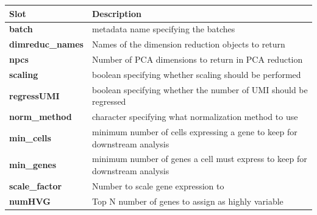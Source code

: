 \documentclass[
]{book}
\begin{document}
\begin{longtable}[]{@{}
  >{\raggedright\arraybackslash}p{}
  >{\raggedright\arraybackslash}p{}@{}}
\toprule
\textbf{Slot} & \textbf{Description} \\
\midrule
\endhead
\textbf{batch} & metadata name specifying the batches \\
\textbf{dimreduc\_names} & Names of the dimension reduction objects to return \\
\textbf{npcs} & Number of PCA dimensions to return in PCA reduction \\
\textbf{scaling} & boolean specifying whether scaling should be performed \\
\textbf{regressUMI} & boolean specifying whether the number of UMI should be regressed \\
\textbf{norm\_method} & character specifying what normalization method to use \\
\textbf{min\_cells} & minimum number of cells expressing a gene to keep for downstream analysis \\
\textbf{min\_genes} & minimum number of genes a cell must express to keep for downstream analysis \\
\textbf{scale\_factor} & Number to scale gene expression to \\
\textbf{numHVG} & Top N number of genes to assign as highly variable \\
\bottomrule
\end{longtable}

  
\end{document}
